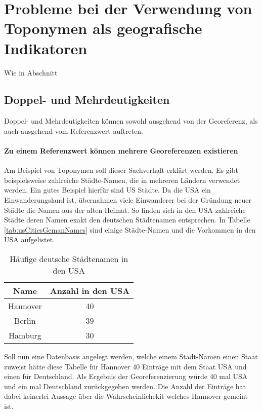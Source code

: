 			\section{Probleme bei der Verwendung von Toponymen als geografische Indikatoren}

				Wie in Abschnitt 


				\subsection{Doppel- und Mehrdeutigkeiten} 

						Doppel- und Mehrdeutigkeiten können sowohl ausgehend von der Georeferenz, als auch ausgehend vom Referenzwert auftreten.

						\paragraph{Zu einem Referenzwert können mehrere Georeferenzen existieren}

							Am Beispiel von Toponymen soll dieser Sachverhalt erklärt werden.
							Es gibt beispielsweise zahlreiche Städte-Namen, die in mehreren Ländern verwendet werden.
							Ein gutes Beispiel hierfür sind US Städte. 
							Da die USA ein Einwanderungsland ist, übernahmen viele Einwanderer bei der Gründung neuer Städte die Namen aus der alten Heimat. 
							So finden sich in den USA zahlreiche Städte deren Namen exakt den deutschen Städtenamen entsprechen. 
							In Tabelle \ref{tab:usCitiesGemanNames} sind einige Städte-Namen und die Vorkommen in den USA aufgelistet.
							
							\begin{table}[htpb]
								\caption{Häufige deutsche Städtenamen in den USA} 
								\centering
								\begin{tabular}{|c|c|}
									\hline
									Name & Anzahl in den USA \\
									\hline\hline
									Hannover & 40 \\
									\hline
									Berlin & 39 \\
									\hline
									Hamburg & 30 \\
									\hline
								\end{tabular}
								\label{tab:usCitiesGermanNames} 
							\end{table}


							Soll nun eine Datenbasis angelegt werden, welche einem Stadt-Namen einen Staat zuweist hätte diese Tabelle für Hannover 40 Einträge mit dem Staat USA und einen für Deutschland.
							Als Ergebnis der Georeferenzierung würde 40 mal USA und ein mal Deutschland zurückgegeben werden. 
							Die Anzahl der Einträge hat dabei keinerlei Aussage über die Wahrscheinlichekit welches Hannover gemeint ist.

